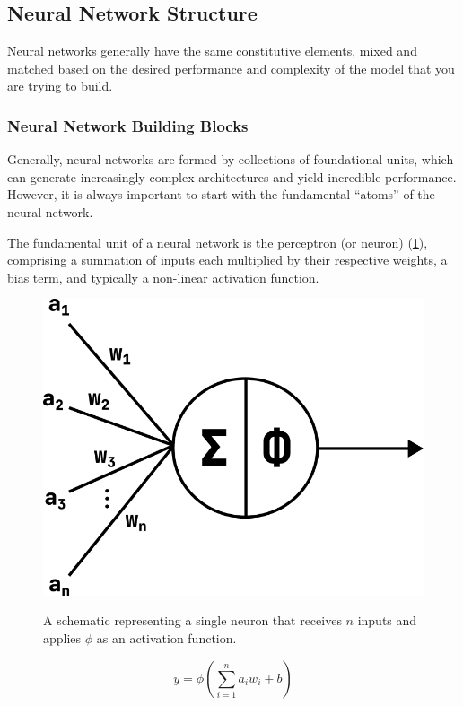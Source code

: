 \subsection{Neural Network Structure}
Neural networks generally have the same constitutive elements, mixed and matched based on the desired performance and complexity of the model that you are trying to build.

\subsubsection{Neural Network Building Blocks}
Generally, neural networks are formed by collections of foundational units, which can generate increasingly complex architectures and yield incredible performance.
However, it is always important to start with the fundamental ``atoms'' of the neural network.

The fundamental unit of a neural network is the perceptron (or neuron) (\cref{fig:neuron}), comprising a summation of inputs each multiplied by their respective weights, a bias term, and typically a non-linear activation function.

\begin{figure}[h!]
    \begin{center}
        {\includegraphics[width=0.55\linewidth]{figs/background/png/neuron.png}}
    \end{center}
    \caption{A schematic representing a single neuron that receives $n$ inputs and applies $\phi$ as an activation function.}
    \label{fig:neuron}
\end{figure}

\begin{equation}
    y = \phi(\sum_{i=1}^{n}a_i w_i + b)
    \label{eq:neuron}
\end{equation}

